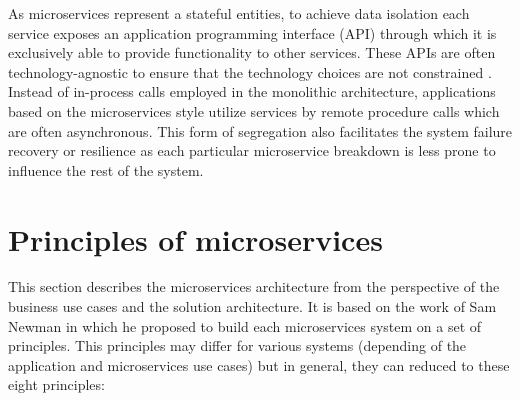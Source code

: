 \documentclass[oneside,
  digital, %
  table,   %
  nolof,     %
  nolot,     %
]{fithesis3}
\begin{document}
As microservices represent a stateful entities, to achieve data isolation each service exposes an application programming interface (API) through which it is exclusively able to provide functionality to other services. These APIs are often technology-agnostic to ensure that the technology choices are not constrained \cite{building_ms}. Instead of in-process calls employed in the monolithic architecture, applications based on the microservices style utilize services by remote procedure calls which are often asynchronous. This form of segregation also facilitates the system failure recovery or resilience as each particular microservice breakdown is less prone to influence the rest of the system.

\section{Principles of microservices}

This section describes the microservices architecture from the perspective of the business use cases and the solution architecture. It is based on the work of Sam Newman \cite{building_ms, principles_of_microservices} in which he proposed to build each microservices system on a set of principles. This principles may differ for various systems (depending of the application and microservices use cases) but in general, they can reduced to these eight principles:
\end{document}
